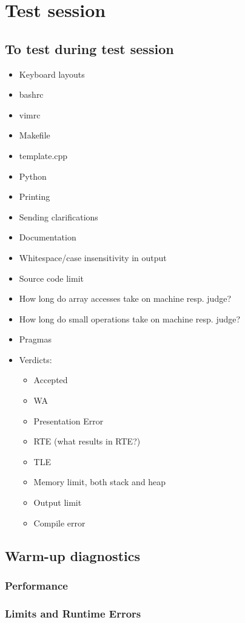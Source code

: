 \appendix
\chapter{Test session}

\section{To test during test session}
\begin{itemize}
	\item Keyboard layouts
	\item bashrc
	\item vimrc
	\item Makefile
	\item template.cpp
	\item Python
	\item Printing
	\item Sending clarifications
	\item Documentation
	\item Whitespace/case insensitivity in output
	\item Source code limit
	\item How long do array accesses take on machine resp. judge?
	\item How long do small operations take on machine resp. judge?
	\item Pragmas
	\item Verdicts:
		\begin{itemize}
			\item Accepted
			\item WA
			\item Presentation Error
			\item RTE (what results in RTE?)
			\item TLE
			\item Memory limit, both stack and heap
			\item Output limit
			\item Compile error
		\end{itemize}
\end{itemize}

\section{Warm-up diagnostics}

\subsection{Performance}

\subsection{Limits and Runtime Errors}
